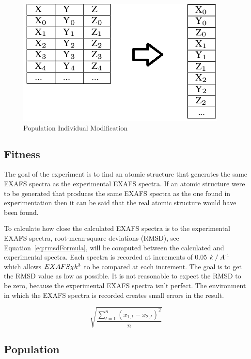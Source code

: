\documentclass[conference]{IEEEtran}
\begin{document}
\begin{figure}
  \caption{Population Individual Modification}
  \label{fig:postOpExplain}
  \begin{center}
    \includegraphics[bb=0 0 400 241,scale=0.5]{refs/ThisBecomesThat.png}
  \end{center}
\end{figure}

\subsection{Fitness}

The goal of the experiment is to find an atomic structure that generates the same EXAFS spectra as the experimental EXAFS spectra. If an atomic structure were to be generated that produces the same EXAFS spectra as the one found in experimentation then it can be said that the real atomic structure would have been found.

To calculate how close the calculated EXAFS spectra is to the experimental EXAFS spectra, root-mean-square deviations (RMSD), see Equation~\ref{eq:rmsdFormula}, will be computed between the calculated and experimental spectra. Each spectra is recorded at increments of 0.05 $k \mathbin{/} A\textsuperscript{-1}$ which allows $EXAFS \chi k\textsuperscript{3}$ to be compared at each increment. The goal is to get the RMSD value as low as possible. It is not reasonable to expect the RMSD to be zero, because the experimental EXAFS spectra isn't perfect. The environment in which the EXAFS spectra is recorded creates small errors in the result.

\begin{equation}
  \label{eq:rmsdFormula}
  \sqrt{\frac{\sum_{t=1}^{n} \left ( x_{1,t}-x_{2,t} \right )^{2}}{n}}
\end{equation}

\subsection{Population}
\label{sec:population}
\end{document}
